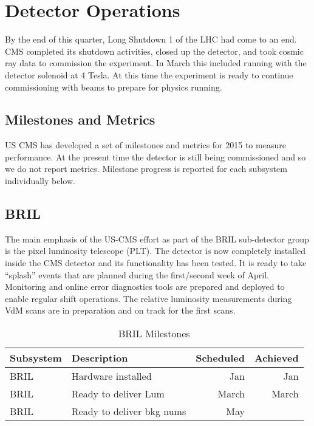 \documentclass[12pt]{article}
\begin{document}
\section{Detector Operations}
By the end of this quarter, Long Shutdown 1 of the LHC had come to an end.  CMS completed its shutdown activities, closed up the detector, and took cosmic ray data to commission the experiment.   In March this included running with the detector solenoid at 4 Tesla.  At this time the experiment is ready to continue commissioning with beams to prepare for physics running.

\subsection{Milestones and Metrics}
US CMS has developed a set of milestones and metrics for 2015 to measure performance.   At the present time the detector is still being commissioned and so we do not report metrics.   Milestone progress is reported for each subsystem individually below.





\subsection{BRIL}
The main emphasis of the US-CMS effort as part of the BRIL sub-detector group is the pixel 
luminosity telescope (PLT). The detector is now completely installed inside the CMS detector 
and its functionality has been tested. It is ready to take ``splash'' events that are planned 
during the first/second week of April. Monitoring and online error diagnostics tools are prepared and deployed to enable
regular shift operations. The relative luminosity measurements during VdM scans are in preparation 
and on track for the first scans. 
\begin{table}[htdp]
\caption{BRIL Milestones}
\begin{center}
\begin{tabular}{|l|l|r|r|}
\hline
Subsystem&Description&Scheduled&Achieved\\
\hline
BRIL & Hardware installed& Jan & Jan\\
\hline
BRIL& Ready to deliver Lum& March & March \\
\hline
BRIL & Ready to deliver bkg nums& May & \\
\hline
\end{tabular}
\end{center}
\label{BRILMIlestones}
\end{table}%
\end{document}
